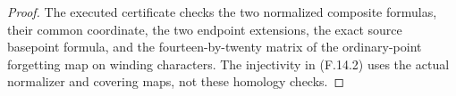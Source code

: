 \begin{proof}
The executed certificate
checks the two normalized composite formulas,
their common coordinate, the two endpoint
extensions, the exact source basepoint formula,
and the fourteen-by-twenty matrix of the
ordinary-point forgetting map on winding
characters.  The injectivity in (F.14.2)
uses the actual normalizer and covering maps,
not these homology checks.
\end{proof}
